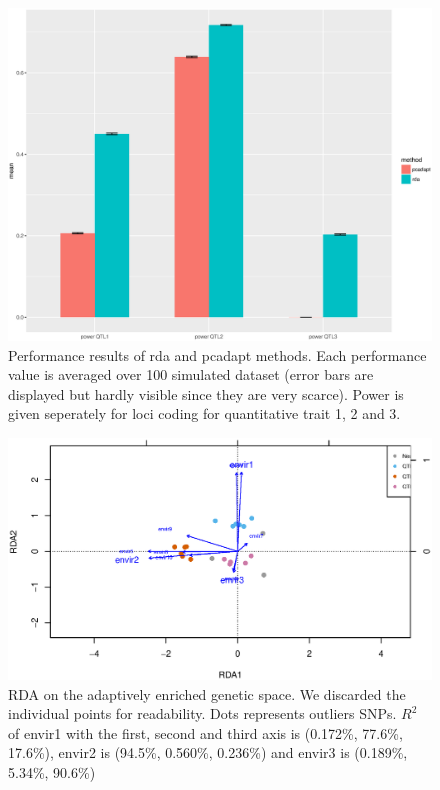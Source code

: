 \documentclass[a4paper,times,10pt,authoryear]{article}%
\begin{document}
\begin{figure}[t]
\begin{center}
\includegraphics[height=0.4\textheight]{figures/overallresults.eps}
\end{center}
\caption{Performance results of rda and pcadapt methods. Each performance value is averaged over 100 simulated dataset (error bars are displayed but hardly visible since they are very scarce). Power is given seperately for loci coding for quantitative trait 1, 2 and 3.}%
\label{fig:performance}%
\end{figure}

\begin{figure}[t]
\begin{center}
\includegraphics[height=0.4\textheight]{figures/rdaA.eps}
\end{center}
\caption{RDA on the adaptively enriched genetic space. We discarded the individual points for readability. Dots represents outliers SNPs.  $R^2$ of envir1 with the first, second and third axis is (0.172\%, 77.6\%, 17.6\%), envir2 is (94.5\%, 0.560\%, 0.236\%) and envir3 is (0.189\%, 5.34\%, 90.6\%)}%
\label{fig:rdaA}%
\end{figure}
\end{document}
